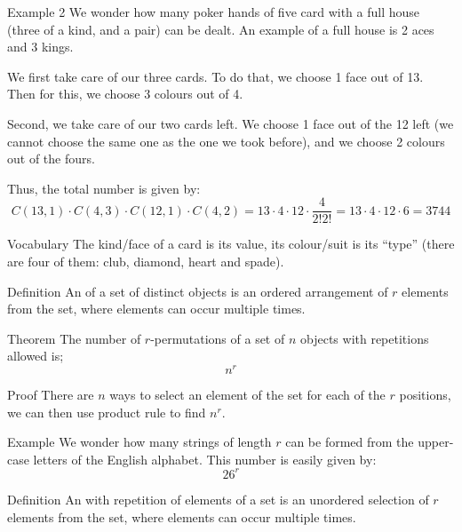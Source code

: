\documentclass[a4paper]{article}
\begin{document}
\begin{parag}{Example 2}
    We wonder how many poker hands of five card with a full house (three of a kind, and a pair) can be dealt. An example of a full house is 2 aces and 3 kings.

    We first take care of our three cards. To do that, we choose 1 face out of 13. Then for this, we choose 3 colours out of 4.

    Second, we take care of our two cards left. We choose 1 face out of the 12 left (we cannot choose the same one as the one we took before), and we choose 2 colours out of the fours. 

    Thus, the total number is given by: 
    \[C\left(13, 1\right)\cdot C\left(4,3\right) \cdot C\left(12,1\right) \cdot C\left(4,2\right) = 13 \cdot 4 \cdot 12 \cdot \frac{4}{2!2!} = 13\cdot 4\cdot 12\cdot 6 = 3744\]
    
    \begin{subparag}{Vocabulary}
        The kind/face of a card is its value, its colour/suit is its ``type'' (there are four of them: club, diamond, heart and spade).
    \end{subparag}
\end{parag}

\begin{parag}{Definition}
    An  of a set of distinct objects is an ordered arrangement of $r$ elements from the set, where elements can occur multiple times.
\end{parag}

\begin{parag}{Theorem}
    The number of $r$-permutations of a set of $n$ objects with repetitions allowed is; 
    \[n^r\]

    \begin{subparag}{Proof}
        There are $n$ ways to select an element of the set for each of the $r$ positions, we can then use product rule to find $n^r$.
    \end{subparag}
    
\end{parag}

\begin{parag}{Example}
    We wonder how many strings of length $r$ can be formed from the upper-case letters of the English alphabet. This number is easily given by: 
    \[26^{r}\]
\end{parag}

\begin{parag}{Definition}
    An  with repetition of elements of a set is an unordered selection of $r$ elements from the set, where elements can occur multiple times.
\end{parag}
\end{document}
